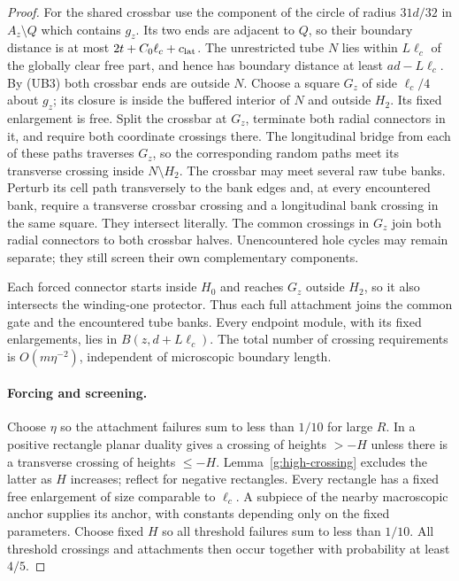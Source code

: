 \begin{proof}
For the shared crossbar use the component of the circle of radius
\(31d/32\) in \(A_z\setminus Q\) which contains \(g_z\).
Its two ends are adjacent to \(Q\), so their boundary distance is
at most \(2t+C_0\ell_c+c_{\rm lat}\).  The unrestricted tube \(N\) lies
within \(L\ell_c\) of the globally clear free part, and hence has boundary
distance at least \(ad-L\ell_c\).  By (UB3) both crossbar ends are outside
\(N\).  Choose a square \(G_z\) of side \(\ell_c/4\) about \(g_z\);
its closure is inside the buffered interior of \(N\) and outside
\(H_2\).  Its fixed enlargement is free.  Split the crossbar at
\(G_z\), terminate both radial connectors in it, and require both
coordinate crossings there.  The longitudinal bridge from each of
these paths traverses \(G_z\), so the corresponding random paths
meet its transverse crossing inside \(N\setminus H_2\).
The crossbar may meet several raw tube banks.
Perturb its cell path transversely to the bank edges and, at every
encountered bank, require a transverse crossbar crossing and a
longitudinal bank crossing in the same square.  They intersect
literally.  The common crossings in \(G_z\) join both radial
connectors to both crossbar halves.  Unencountered hole cycles may remain separate;
they still screen their own complementary components.

Each forced connector starts inside \(H_0\) and reaches \(G_z\)
outside \(H_2\), so it also intersects the winding-one protector.
Thus each full attachment joins the common gate and the encountered
tube banks.  Every endpoint module, with its fixed enlargements,
lies in \(B(z,d+L\ell_c)\).  The total number of crossing requirements
is \(O(m\eta^{-2})\), independent of microscopic boundary length.

\paragraph{Forcing and screening.}
Choose \(\eta\) so the attachment failures sum to less than \(1/10\)
for large \(R\).  In a positive rectangle planar duality gives a
crossing of heights \(>-H\) unless there is a transverse crossing
of heights \(\le-H\).  Lemma~\ref{g:high-crossing} excludes the
latter as \(H\) increases; reflect for negative rectangles.
Every rectangle has a fixed free enlargement of size comparable to
\(\ell_c\).  A subpiece of the nearby macroscopic anchor supplies its
anchor, with constants depending only on the fixed parameters.
Choose fixed \(H\) so all threshold failures sum to less than \(1/10\).
All threshold crossings and attachments then occur together with
probability at least \(4/5\).


\end{proof}

